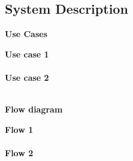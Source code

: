 \subsection{System Description}

\Large{\textbf{Use Cases}}
\normalsize

\large\textbf{Use case 1} \\
\textbf{\\}
\large\textbf{Use case 2} \\
\textbf{\\}

\Large{\textbf{Flow diagram}}
\normalsize

\large\textbf{Flow 1} \\
\textbf{\\}
\large\textbf{Flow 2} \\

\normalsize